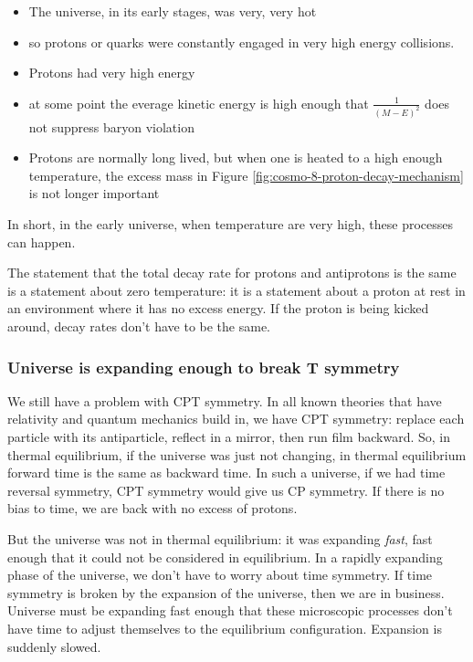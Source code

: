 \documentclass[]{article}
\begin{document}
 \begin{itemize}
 	\item The universe, in its early stages, was very, very hot
 	\item so protons or quarks were constantly engaged in very high energy collisions. 
 	\item Protons had very high energy
 	\item at some point the everage kinetic energy is high enough that $\frac{1}{(M-E)^2}$ does not suppress baryon violation
 	\item Protons are normally long lived, but when one is heated to a high enough temperature, the excess mass in Figure \ref{fig:cosmo-8-proton-decay-mechanism} is not longer important
 \end{itemize}
 
 In short, in the early universe, when temperature are very high, these processes can happen.
 
 The statement that the total decay rate for protons and antiprotons is the same is a statement about zero temperature: it is a statement about a proton at rest in an environment where it has no excess energy. If the proton is being kicked around, decay rates don't have to be the same.
 
 \subsubsection{Universe is expanding enough to break T symmetry}\label{sec:sakharov3}
 We still have a problem with CPT symmetry. In all known theories that have relativity and quantum mechanics build in, we have CPT symmetry: replace each particle with its antiparticle, reflect in a mirror, then run film backward.
 So, in thermal equilibrium, if the universe was just not changing, in thermal equilibrium forward time is the same as backward time. In such a universe, if we had time reversal symmetry, CPT symmetry would give us CP symmetry. If there is no bias to time, we are back with no excess of protons.
 
 But the universe was not in thermal equilibrium: it was expanding \emph{fast}, fast enough that it could not be considered in equilibrium. In a rapidly expanding phase of the universe, we don't have to worry about time symmetry. If time symmetry is broken by the expansion of the universe, then we are in business.
 Universe must be expanding fast enough that these microscopic processes don't have time to adjust themselves to the equilibrium configuration. Expansion is suddenly slowed.
 
\end{document}
